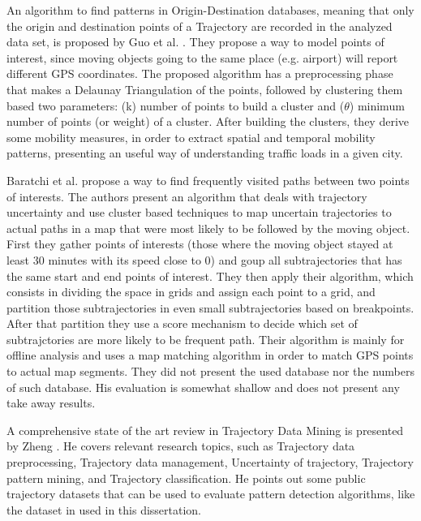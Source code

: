 An algorithm to find patterns in Origin-Destination databases, meaning that only the origin and destination points of a
Trajectory are recorded in the analyzed data set, is proposed by Guo et al. \citep{discovering_orig_dest}. They propose
a way to model points of interest, since moving objects going to the same place (e.g. airport) will report different GPS
coordinates. The proposed algorithm has a preprocessing phase that makes a Delaunay Triangulation of the points,
followed by clustering them based two parameters: (k) number of points to build a cluster and ($\theta$) minimum number
of points (or weight) of a cluster. After building the clusters, they derive some mobility measures, in order to extract
spatial and temporal mobility patterns, presenting an useful way of understanding traffic loads in a given city.

Baratchi et al. propose a way to find frequently visited paths between two points of interests. The authors present an
algorithm that deals with trajectory uncertainty and use cluster based techniques to map uncertain trajectories to
actual paths in a map that were most likely to be followed by the moving object. First they gather points of interests
(those where the moving object stayed at least 30 minutes with its speed close to 0) and goup all subtrajectories that
has the same start and end points of interest. They then apply their algorithm, which consists in dividing the space in
grids and assign each point to a grid, and partition those subtrajectories in even small subtrajectories based on
breakpoints. After that partition they use a score mechanism to decide which set of subtrajctories are more likely to be
frequent path. Their algorithm is mainly for offline analysis and uses a map matching algorithm in order to match GPS
points to actual map segments. They did not present the used database nor the numbers of such database. His evaluation
is somewhat shallow and does not present any take away results.

A comprehensive state of the art review in Trajectory Data Mining is presented by Zheng \citep{survey}. He covers
relevant research topics, such as Trajectory data preprocessing, Trajectory data management, Uncertainty of trajectory,
Trajectory pattern mining, and Trajectory classification. He points out some public trajectory datasets that can be used
to evaluate pattern detection algorithms, like the dataset in \citep{tdrive} used in this dissertation.

